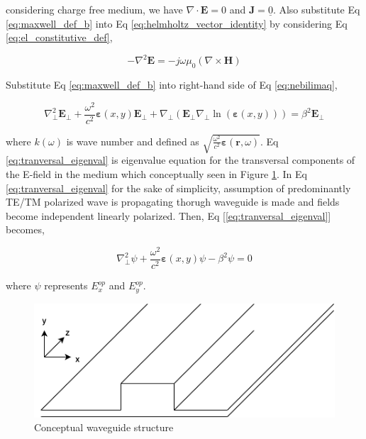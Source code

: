 \documentclass[thesis]{deutez}
\begin{document}
    considering charge free medium, we have $\nabla \cdot \mathbf{E}=0$ and $\mathbf{J}=\underline{0}$. Also substitute Eq \ref{eq:maxwell_def_b} into Eq \ref{eq:helmholtz_vector_identity} by considering Eq \ref{eq:el_constitutive_def},

    \begin{equation}
        - \nabla^2 \mathbf{E} = -j\omega\mu_0 (\nabla \times \mathbf{H})
        \label{eq:nebilimaq}
    \end{equation}
    
    Substitute Eq \ref{eq:maxwell_def_b} into right-hand side of Eq \ref{eq:nebilimaq},

    \begin{equation}
        \nabla_{\perp}^2 \mathbf{E}_{\perp} + \frac{\omega^2}{c^2}\bm{\varepsilon}(x,y) \mathbf{E}_{\perp} + \nabla_{\perp} (\mathbf{E}_{\perp} \nabla_{\perp} \ln(\bm{\varepsilon}(x,y)) ) = \beta^2 \mathbf{E}_{\perp}
        \label{eq:tranversal_eigenval}
    \end{equation}
    
    where $k(\omega)$ is wave number and defined as $\sqrt{\frac{\omega^2}{c^2}\bm{\varepsilon}(\mathbf{r},\omega)}$. Eq \ref{eq:tranversal_eigenval} is eigenvalue equation for the transversal components of the E-field in the medium which conceptually seen in Figure \ref{fig:2dWGgeom}. In Eq \ref{eq:tranversal_eigenval} for the sake of simplicity, assumption of predominantly TE/TM polarized wave is propagating thorugh waveguide is made and fields become independent linearly polarized. Then, Eq [\ref{eq:tranversal_eigenval}] becomes,

    \begin{equation}
        \nabla_{\perp}^2 \psi + \frac{\omega^2}{c^2}\bm{\varepsilon}(x,y) \psi - \beta^2  \psi = 0
        \label{eq:tranversal_eigenval_scalar}
    \end{equation}

    where $\psi$ represents $E_x^{op}$ and $E_y^{op}$. 
    
    \begin{figure}
        \centering
        \includegraphics[width=0.5\linewidth]{2dWGgeom-2.png}
        \caption{Conceptual waveguide structure}
        \label{fig:2dWGgeom}
    \end{figure}
    
\end{document}
